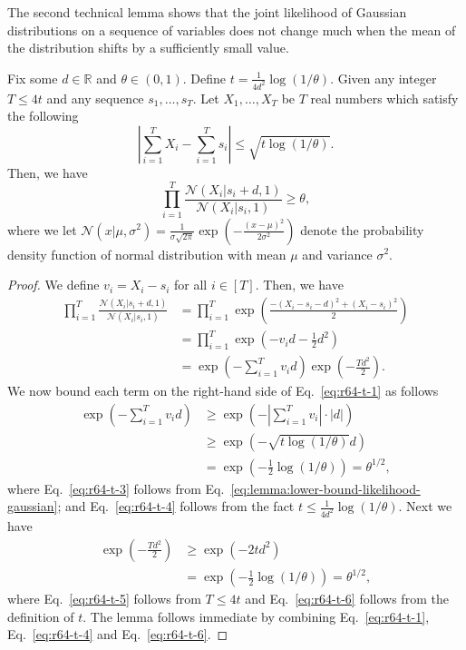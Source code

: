 \documentclass{article}
\newcommand{\RR}{\mathbb R}
\begin{document}
The second technical lemma shows that 
the joint likelihood of Gaussian distributions on a sequence of variables 
does not change much 
when the mean of the distribution shifts by a sufficiently small value.
\begin{lemma}
\label{lemma:lower-bound-likelihood-gaussian}
Fix some $d \in \RR$ and $\theta \in (0,1)$.
Define $t = \frac{1}{4 d^2}\log(1/\theta)$.
Given any integer $T \le 4t$  and any sequence $s_1,\ldots, s_T$.
Let $X_1,\ldots, X_T$ be $T$ real numbers which satisfy the following
\begin{equation}
\label{eq:lemma:lower-bound-likelihood-gaussian}
\left|\sum_{i=1}^T X_i -  \sum_{i=1}^T s_i \right| \le \sqrt{t\log(1/\theta)}.
\end{equation}
Then, we have
$$
\prod_{i=1}^T \frac{\mathcal N(X_i | s_i+d, 1)}{\mathcal N(X_i | s_i, 1)} \ge \theta,
$$
where we let $\mathcal N(x | \mu,\sigma^2)=\frac{1}{\sigma\sqrt{2\pi}}\exp\left(-\frac{(x-\mu)^2}{2\sigma^2}\right)$ 
denote the probability density function of normal distribution with mean $\mu$ and variance $\sigma^2$.
\end{lemma}
\begin{proof}
We define $v_i = X_i-s_i$ for all $i\in [T]$. Then, we have
\begin{align}
  \prod_{i=1}^T \frac{\mathcal N(X_i | s_i+d, 1)}{\mathcal N(X_i | s_i, 1)} 
  &= 
  \prod_{i=1}^{T}
  \exp\left(\frac{-\left(X_i-s_i-d\right)^2+(X_i-s_i)^2}{2}\right) \nonumber \\
  &= 
  \prod_{i=1}^{T}
  \exp\left(- v_i d- \frac{1}{2} d^2 \right) \nonumber\\
  &=
  \exp\left(-\sum_{i=1}^T v_id \right)
  \exp\left(-\frac{Td^2}{2} \right). \label{eq:r64-t-1}
\end{align}
We now bound each term on the right-hand side of Eq.~\eqref{eq:r64-t-1} as follows
\begin{align}
	\exp\left(-\sum_{i=1}^T v_id \right) & \ge \exp\left(-\left|\sum_{i=1}^T v_i \right| \cdot |d| \right)\nonumber\\
																			 & \ge \exp\left(-\sqrt{t\log(1/\theta)} d \right) \label{eq:r64-t-3}\\
																			 & = \exp\left(-\frac12 \log(1/\theta) \right) = \theta^{1/2}, \label{eq:r64-t-4}
\end{align}
where Eq.~\eqref{eq:r64-t-3} follows from Eq.~\eqref{eq:lemma:lower-bound-likelihood-gaussian};
and Eq.~\eqref{eq:r64-t-4} follows from the fact $t \le \frac{1}{4 d^2}\log(1/\theta)$.
Next we have
\begin{align}
	\exp\left(-\frac{Td^2}{2} \right) & \ge \exp\left(-2t d ^2\right) \label{eq:r64-t-5}\\
																		& = \exp\left(-\frac12 \log(1/\theta) \right) = \theta^{1/2},\label{eq:r64-t-6}
\end{align}
where Eq.~\eqref{eq:r64-t-5} follows from $T \le 4t$ and Eq.~\eqref{eq:r64-t-6} follows from the definition of $t$.
The lemma follows immediate by combining Eq.~\eqref{eq:r64-t-1}, Eq.~\eqref{eq:r64-t-4} and Eq.~\eqref{eq:r64-t-6}.
\end{proof}
\end{document}
